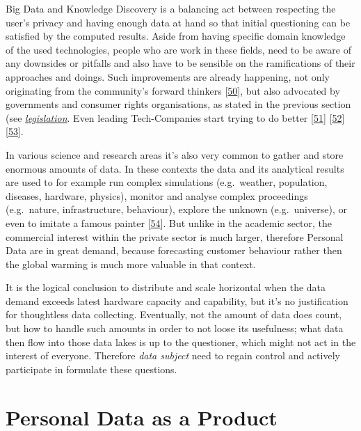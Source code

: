 \documentclass[12pt,english,a4paper,titlepage,cleardoublepage=empty,dottedtoc]{report}
\begin{document}
Big Data and Knowledge Discovery is a balancing act between respecting
the user's privacy and having enough data at hand so that initial
questioning can be satisfied by the computed results. Aside from having
specific domain knowledge of the used technologies, people who are work
in these fields, need to be aware of any downsides or pitfalls and also
have to be sensible on the ramifications of their approaches and doings.
Such improvements are already happening, not only originating from the
community's forward thinkers
{[}\protect\hyperlink{ref-web_2016_the-state-of-big-data}{50}{]}, but
also advocated by governments and consumer rights organisations, as
stated in the previous section (see
\emph{\protect\hyperlink{digital-identity-personal-data-and-ownership}{legislation}}.
Even leading Tech-Companies start trying to do better
{[}\protect\hyperlink{ref-web_2016_apple_customer-letter}{51}{]}
{[}\protect\hyperlink{ref-web_2016_what-is-differential-privacy}{52}{]}
{[}\protect\hyperlink{ref-web_2016_eff_whatsapp-rolls-out-emd-to-end-encryption}{53}{]}.

In various science and research areas it's also very common to gather
and store enormous amounts of data. In these contexts the data and its
analytical results are used to for example run complex simulations
(e.g.~weather, population, diseases, hardware, physics), monitor and
analyse complex proceedings (e.g.~nature, infrastructure, behaviour),
explore the unknown (e.g.~universe), or even to imitate a famous painter
{[}\protect\hyperlink{ref-web_2016_research-experiment_ai-rembrandt}{54}{]}.
But unlike in the academic sector, the commercial interest within the
private sector is much larger, therefore Personal Data are in great
demand, because forecasting customer behaviour rather then the global
warming is much more valuable in that context.

It is the logical conclusion to distribute and scale horizontal when the
data demand exceeds latest hardware capacity and capability, but it's no
justification for thoughtless data collecting. Eventually, not the
amount of data does count, but how to handle such amounts in order to
not loose its usefulness; what data then flow into those data lakes is
up to the questioner, which might not act in the interest of everyone.
Therefore \emph{data subject} need to regain control and actively
participate in formulate these questions.

\hypertarget{personal-data-as-a-product}{\section{Personal Data as a
Product}\label{personal-data-as-a-product}}
\end{document}
